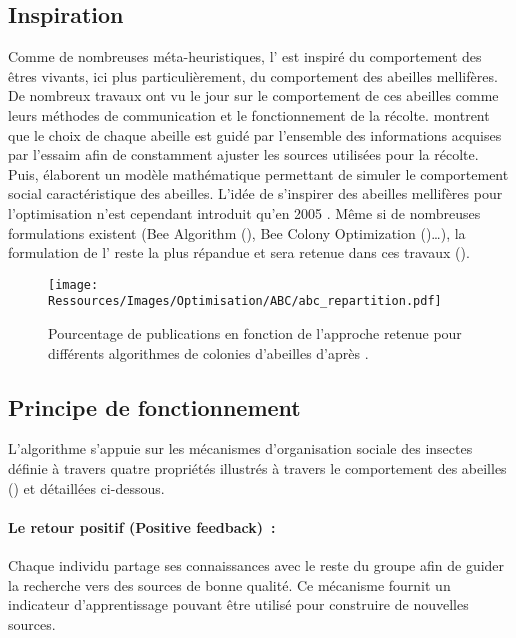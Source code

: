 \subsection{Inspiration} %
\label{sub:inspiration}
Comme de nombreuses méta-heuristiques, l’ est inspiré du comportement des êtres
vivants, ici plus particulièrement, du comportement des abeilles mellifères. De
nombreux travaux ont vu le jour sur le comportement de ces abeilles comme leurs méthodes
de communication et le fonctionnement de la récolte. \textcite{Visscher19821790} montrent
que le choix de chaque abeille est guidé par l’ensemble des informations acquises
par l’essaim afin de constamment ajuster les sources utilisées pour la récolte.
Puis, \textcite{Camazine1991547} élaborent un modèle mathématique permettant de simuler
le comportement social caractéristique des abeilles.
L’idée de s’inspirer des abeilles mellifères pour l’optimisation n’est cependant introduit
qu’en 2005 \parencite{Karaboga2005}. Même si de nombreuses formulations existent (Bee
Algorithm (), Bee Colony Optimization ()\dots), la formulation de
l’ reste la plus répandue et sera retenue dans ces travaux ().

\begin{figure}
    \centering
    \texttt{[image: Ressources/Images/Optimisation/ABC/abc\_repartition.pdf]}
    \caption[Popularité de l’algorithme de colonies d’abeilles ]
            {Pourcentage de publications en fonction de l’approche retenue pour différents
             algorithmes de colonies d’abeilles d’après \cite{Karaboga201221}.}
    \label{fig:abc_repartition}
\end{figure}


\subsection{Principe de fonctionnement} %
\label{sub:principe_de_fonctionnement}
L’algorithme s’appuie sur les mécanismes d’organisation sociale des insectes
\parencite{Bonabeau1999} définie à travers quatre propriétés illustrés à travers le
comportement des abeilles () et détaillées ci-dessous.

\paragraph{Le retour positif (Positive feedback)~:} %
\label{par:positive_feedback}
Chaque individu partage ses connaissances avec le reste du groupe afin de guider
la recherche vers des sources de bonne qualité. Ce mécanisme fournit un indicateur
d’apprentissage pouvant être utilisé pour construire de nouvelles sources.

